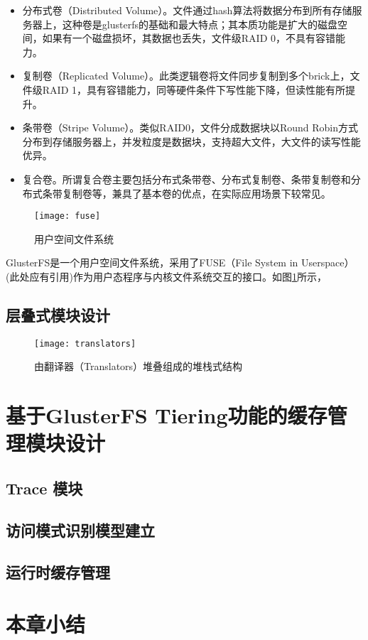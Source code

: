 \begin{itemize}
    \item 分布式卷（Distributed Volume）。文件通过hash算法将数据分布到所有存储服务器上，这种卷是glusterfs的基础和最大特点；其本质功能是扩大的磁盘空间，如果有一个磁盘损坏，其数据也丢失，文件级RAID 0，不具有容错能力。
    \item 复制卷（Replicated Volume）。此类逻辑卷将文件同步复制到多个brick上，文件级RAID 1，具有容错能力，同等硬件条件下写性能下降，但读性能有所提升。
    \item 条带卷（Stripe Volume）。类似RAID0，文件分成数据块以Round Robin方式分布到存储服务器上，并发粒度是数据块，支持超大文件，大文件的读写性能优异。
    \item 复合卷。所谓复合卷主要包括分布式条带卷、分布式复制卷、条带复制卷和分布式条带复制卷等，兼具了基本卷的优点，在实际应用场景下较常见。
\end{itemize}

\begin{figure}[htp]
\centering
\texttt{[image: fuse]}
\caption{用户空间文件系统}
\label{fig:fuse}
\end{figure}
GlusterFS是一个用户空间文件系统，采用了FUSE（File System in Userspace）{\color{red}(此处应有引用)}作为用户态程序与内核文件系统交互的接口。如图\ref{fig:fuse}所示，

\subsection{层叠式模块设计}
\begin{figure}[htp]
\centering
\texttt{[image: translators]}
\caption{由翻译器（Translators）堆叠组成的堆栈式结构}
\label{fig:translators}
\end{figure}
\section{基于GlusterFS Tiering功能的缓存管理模块设计}
\subsection{Trace 模块}
\subsection{访问模式识别模型建立}
\subsection{运行时缓存管理}


\section{本章小结}